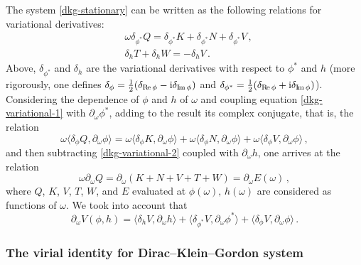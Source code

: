 \documentclass[12pt]{extarticle}
\newcommand{\jj}{\mathrm{i}}
\newcommand{\p}{\partial}
\theoremstyle{plain}
\theoremstyle{remark}
\renewcommand{\Re}{\mathop{\rm{R\hskip -1pt e}}\nolimits}
\renewcommand{\Im}{\mathop{\rm{I\hskip -1pt m}}\nolimits}
\begin{document}
The system
\eqref{dkg-stationary}
can be written as
the following relations
for variational derivatives:
\begin{align}
    \label{dkg-variational-1}
    &
    \omega \delta_{\phi^*} Q
    =\delta_{\phi^*} K+\delta_{\phi^*} N
    +\delta_{\phi^*} V\,,
    \\[1ex]
    \label{dkg-variational-2}
    &
    \delta_h T+\delta_h W
    =-\delta_h V\,.
\end{align}
Above,
$\delta_{\phi^*}$ and $\delta_h$
are the variational derivatives
with respect to $\phi^*$ and $h$
(more rigorously, one defines
$\delta_{\phi}
=\frac 1 2(\delta_{\Re\phi}
-\jj\delta_{\Im\phi})$
and
$\delta_{\phi^*}
=\frac 1 2(\delta_{\Re\phi}
+\jj\delta_{\Im\phi})$).
Considering the dependence
of $\phi$
and $h$ of $\omega$
and
coupling
equation \eqref{dkg-variational-1}
with $\p_\omega\phi^*$,
adding to the result its complex conjugate,
that is,
the relation
\[
    \omega\langle\delta_\phi Q,\p_\omega\phi\rangle
    =
    \omega\langle\delta_\phi K,\p_\omega\phi\rangle
    +
    \omega\langle\delta_\phi N,\p_\omega\phi\rangle
    +
    \omega\langle\delta_\phi V,\p_\omega\phi\rangle\,,
\]
and then subtracting
\eqref{dkg-variational-2}
coupled with $\p_\omega h$,
one arrives at the relation
\begin{equation}\label{dkg-dedq}
    \omega \p_\omega Q
    =
    \p_\omega
    (K+N+V+T+W)
    =\p_\omega E(\omega)\,,
\end{equation}
where
$Q$, $K$, $V$, $T$, $W$,
and
$E$
evaluated at
$\phi(\omega),\,h(\omega)$
are considered as functions
of $\omega$.
We took into account that
\begin{equation}\label{vvv}
    \p_\omega V(\phi,h)
    =
    \langle \delta_h V,\p_\omega h \rangle
    +
    \langle \delta_{\phi^*} V,\p_\omega \phi^* \rangle
    +
    \langle \delta_{\phi} V,\p_\omega \phi\rangle\,.
\end{equation}

\subsubsection*{The virial identity for Dirac--Klein--Gordon system}
\end{document}
